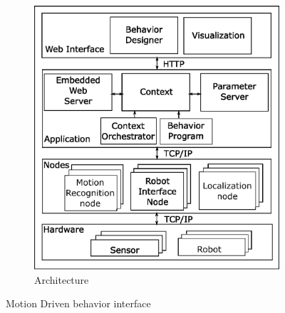 \documentclass{llncs}
\begin{document}
\begin{figure}
\begin{subfigure}[t]{0.48\textwidth}
\includegraphics[width=\textwidth]{../thesis/assets/architecture.eps}
\caption[System Architecture]{Architecture}
\end{subfigure}
\caption[System Architecture]{Motion Driven behavior interface}
\label{fig:architecture}
\end{figure}
\end{document}
